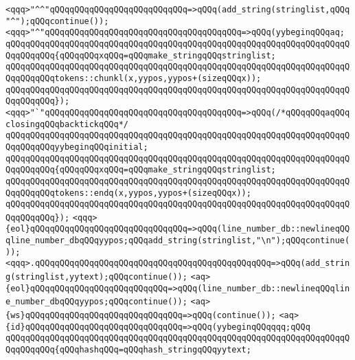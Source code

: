 \verb|<qqq>"^^"qQQqqQQqqQQqqQQqqQQqqQQqqQQq=>qQQq(add_string(stringlist,qQQq"^");qQQqcontinue());|\newline
\verb|<qqq>"^"qQQqqQQqqQQqqQQqqQQqqQQqqQQqqQQqqQQqqQQq=>qQQq(yybeginqQQqaq;|\newline
\verb|qQQqqQQqqQQqqQQqqQQqqQQqqQQqqQQqqQQqqQQqqQQqqQQqqQQqqQQqqQQqqQQqqQQqqQQqqQQqqQQq{qQQqqQQqxqQQq=qQQqmake_stringqQQqstringlist;|\newline
\newline
\verb|qQQqqQQqqQQqqQQqqQQqqQQqqQQqqQQqqQQqqQQqqQQqqQQqqQQqqQQqqQQqqQQqqQQqqQQqqQQqqQQqtokens::chunkl(x,yypos,yypos+(sizeqQQqx));|\newline
\verb|qQQqqQQqqQQqqQQqqQQqqQQqqQQqqQQqqQQqqQQqqQQqqQQqqQQqqQQqqQQqqQQqqQQqqQQqqQQqqQQq});|\newline
\verb|<qqq>"`"qQQqqQQqqQQqqQQqqQQqqQQqqQQqqQQqqQQqqQQq=>qQQq(/*qQQqqQQqaqQQqclosingqQQqbacktickqQQq*/|\newline
\verb|qQQqqQQqqQQqqQQqqQQqqQQqqQQqqQQqqQQqqQQqqQQqqQQqqQQqqQQqqQQqqQQqqQQqqQQqqQQqqQQqyybeginqQQqinitial;|\newline
\verb|qQQqqQQqqQQqqQQqqQQqqQQqqQQqqQQqqQQqqQQqqQQqqQQqqQQqqQQqqQQqqQQqqQQqqQQqqQQqqQQq{qQQqqQQqxqQQq=qQQqmake_stringqQQqstringlist;|\newline
\verb|qQQqqQQqqQQqqQQqqQQqqQQqqQQqqQQqqQQqqQQqqQQqqQQqqQQqqQQqqQQqqQQqqQQqqQQqqQQqqQQqtokens::endq(x,yypos,yypos+(sizeqQQqx));|\newline
\verb|qQQqqQQqqQQqqQQqqQQqqQQqqQQqqQQqqQQqqQQqqQQqqQQqqQQqqQQqqQQqqQQqqQQqqQQqqQQqqQQq});|\newline
\verb|<qqq>{eol}qQQqqQQqqQQqqQQqqQQqqQQqqQQqqQQq=>qQQq(line_number_db::newlineqQQqline_number_dbqQQqyypos;qQQqadd_string(stringlist,"\n");qQQqcontinue());|\newline
\verb|<qqq>.qQQqqQQqqQQqqQQqqQQqqQQqqQQqqQQqqQQqqQQqqQQqqQQq=>qQQq(add_string(stringlist,yytext);qQQqcontinue());|\newline
\newline
\verb|<aq>{eol}qQQqqQQqqQQqqQQqqQQqqQQqqQQq=>qQQq(line_number_db::newlineqQQqline_number_dbqQQqyypos;qQQqcontinue());|\newline
\verb|<aq>{ws}qQQqqQQqqQQqqQQqqQQqqQQqqQQqqQQq=>qQQq(continue());|\newline
\verb|<aq>{id}qQQqqQQqqQQqqQQqqQQqqQQqqQQqqQQq=>qQQq(yybeginqQQqqqq;qQQq|\newline
\verb|qQQqqQQqqQQqqQQqqQQqqQQqqQQqqQQqqQQqqQQqqQQqqQQqqQQqqQQqqQQqqQQqqQQqqQQqqQQqqQQq{qQQqhashqQQq=qQQqhash_stringqQQqyytext;|\newline
